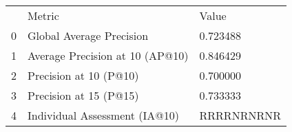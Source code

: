 \begin{tabular}{lll}
 & Metric & Value \\
0 & Global Average Precision & 0.723488 \\
1 & Average Precision at 10 (AP@10) & 0.846429 \\
2 & Precision at 10 (P@10) & 0.700000 \\
3 & Precision at 15 (P@15) & 0.733333 \\
4 & Individual Assessment (IA@10) & RRRRNRNRNR \\
\end{tabular}

